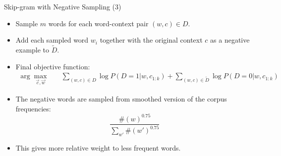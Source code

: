 \documentclass[handout]{beamer}
\begin{document}
\begin{frame}{Skip-gram with Negative Sampling (3)}
\begin{scriptsize}
\begin{itemize}

\item Sample $m$ words for each word-context pair  $(w,c) \in D$.
\item Add each sampled word $w_i$ together with the original context $c$ as a negative example to $\tilde{D}$.



\item Final objective function:
\begin{equation}
\begin{split}
\operatorname{arg} \max_{\vec{c}, \vec{w}} & \quad \sum_{(w,c) \in D}{\log P(D = 1| w,c_{1:k})} + \sum_{(w,c) \in \tilde{D}} \log P(D = 0| w,c_{1:k})
\end{split}
\end{equation}

\item The negative words are sampled from smoothed version of the corpus frequencies:
\begin{displaymath}
\frac{\#(w)^{0.75}}{\sum_{w'}\#(w')^{0.75}}
\end{displaymath}

\item This gives more relative weight to less frequent words.

\end{itemize}
\end{scriptsize}
\end{frame}
\end{document}

